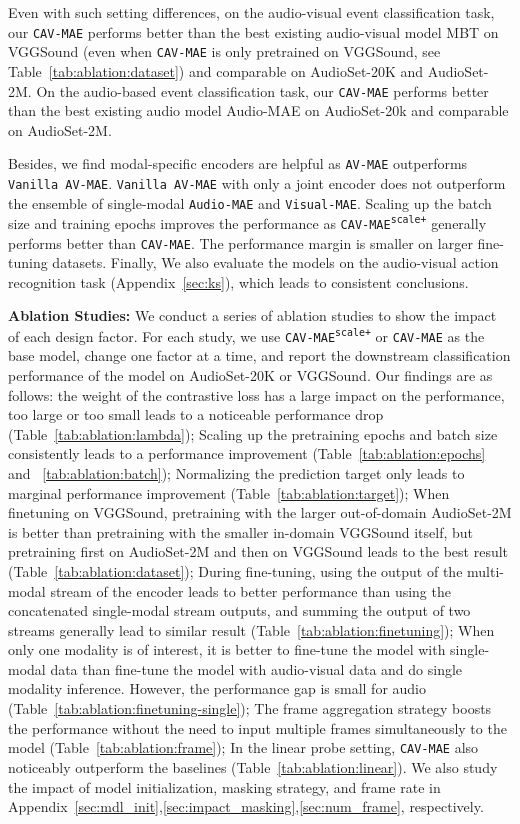 \documentclass{article} \usepackage{iclr2023_conference,times}
\begin{document}
Even with such setting differences, on the audio-visual event classification task, our \texttt{CAV-MAE} performs better than the best existing audio-visual model MBT on VGGSound (even when \texttt{CAV-MAE} is only pretrained on VGGSound, see Table~\ref{tab:ablation:dataset}) and comparable on AudioSet-20K and AudioSet-2M. On the audio-based event classification task, our \texttt{CAV-MAE} performs better than the best existing audio model Audio-MAE on AudioSet-20k and comparable on AudioSet-2M.

Besides, we find modal-specific encoders are helpful as \texttt{AV-MAE} outperforms \texttt{Vanilla AV-MAE}. \texttt{Vanilla AV-MAE} with only a joint encoder does not outperform the ensemble of single-modal \texttt{Audio-MAE} and \texttt{Visual-MAE}. Scaling up the batch size and training epochs improves the performance as \texttt{CAV-MAE\textsuperscript{scale+}} generally performs better than \texttt{CAV-MAE}. The performance margin is smaller on larger fine-tuning datasets. Finally, We also evaluate the models on the audio-visual action recognition task (Appendix~\ref{sec:ks}), which leads to consistent conclusions.

\textbf{Ablation Studies: } We conduct a series of ablation studies to show the impact of each design factor. For each study, we use \texttt{CAV-MAE\textsuperscript{scale+}} or \texttt{CAV-MAE} as the base model, change one factor at a time, and report the downstream classification performance of the model on AudioSet-20K or VGGSound. Our findings are as follows: the weight of the contrastive loss  has a large impact on the performance, too large or too small  leads to a noticeable performance drop (Table~\ref{tab:ablation:lambda}); Scaling up the pretraining epochs and batch size consistently leads to a performance improvement (Table~\ref{tab:ablation:epochs} and ~\ref{tab:ablation:batch}); Normalizing the prediction target only leads to marginal performance improvement (Table~\ref{tab:ablation:target}); When finetuning on VGGSound, pretraining with the larger out-of-domain AudioSet-2M is better than pretraining with the smaller in-domain VGGSound itself, but pretraining first on AudioSet-2M and then on VGGSound leads to the best result (Table~\ref{tab:ablation:dataset}); During fine-tuning, using the output of the multi-modal stream of the encoder leads to better performance than using the concatenated single-modal stream outputs, and summing the output of two streams generally lead to similar result (Table~\ref{tab:ablation:finetuning}); When only one modality is of interest, it is better to fine-tune the model with single-modal data than fine-tune the model with audio-visual data and do single modality inference. However, the performance gap is small for audio (Table~\ref{tab:ablation:finetuning-single}); The frame aggregation strategy boosts the performance without the need to input multiple frames simultaneously to the model (Table~\ref{tab:ablation:frame}); In the linear probe setting, \texttt{CAV-MAE} also noticeably outperform the baselines (Table~\ref{tab:ablation:linear}). We also study the impact of model initialization, masking strategy, and frame rate in Appendix~\ref{sec:mdl_init},\ref{sec:impact_masking},\ref{sec:num_frame}, respectively.
\end{document}
